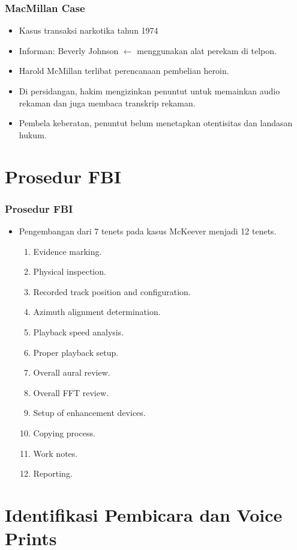 \documentclass[pdflatex,compress]{beamer}
\begin{document}
\begin{frame}
	\frametitle{MacMillan Case}
	\begin{itemize}
		\item Kasus transaksi narkotika tahun 1974
		\item Informan: Beverly Johnson $\leftarrow$ menggunakan alat perekam di telpon.
		\item Harold McMillan terlibat perencanaan pembelian heroin.
		\item Di persidangan, hakim mengizinkan penuntut untuk memainkan audio rekaman dan juga membaca transkrip rekaman.
		\item Pembela keberatan, penuntut belum menetapkan otentisitas dan landasan hukum.
	\end{itemize}
\end{frame}

\section{Prosedur FBI}

\begin{frame}
	\frametitle{Prosedur FBI}
	\begin{itemize}
		\item Pengembangan dari 7 tenets pada kasus McKeever menjadi 12 tenets.
		\begin{enumerate}
			\item Evidence marking.
			\item Physical inspection.
			\item Recorded track position and configuration.
			\item Azimuth alignment determination.
			\item Playback speed analysis.
			\item Proper playback setup.
			\item Overall aural review.
			\item Overall FFT review.
			\item Setup of enhancement devices.
			\item Copying process.
			\item Work notes.
			\item Reporting.
		\end{enumerate}
	\end{itemize}
\end{frame}

\section{Identifikasi Pembicara dan Voice Prints}
\end{document}
